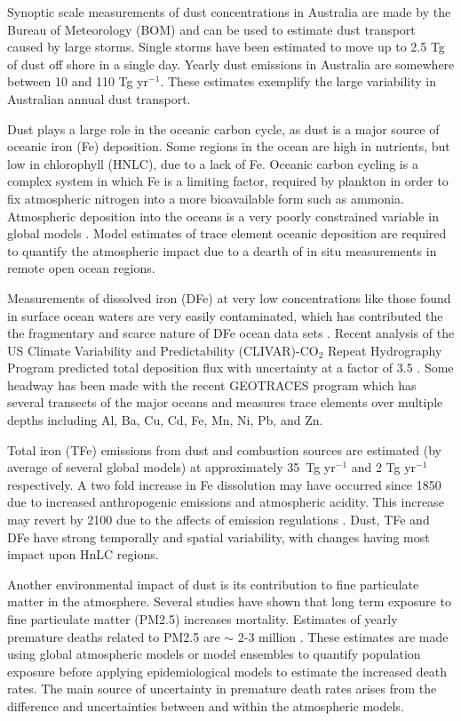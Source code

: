   Synoptic scale measurements of dust concentrations in Australia are made by the Bureau of Meteorology (BOM) and can be used to estimate dust transport caused by large storms. 
  Single storms have been estimated to move up to 2.5 Tg of dust off shore in a single day.
  Yearly dust emissions in Australia are somewhere between 10 and 110 Tg yr$^{-1}$.
  These estimates exemplify the large variability in Australian annual dust transport.

  Dust plays a large role in the oceanic carbon cycle, as dust is a major source of oceanic iron (Fe) deposition.
  Some regions in the ocean are high in nutrients, but low in chlorophyll (HNLC), due to a lack of Fe.
  Oceanic carbon cycling is a complex system in which Fe is a limiting factor, required by plankton in order to fix atmospheric nitrogen into a more bioavailable form such as ammonia.
  Atmospheric deposition into the oceans is a very poorly constrained variable in global models \citep{Grand2015}.
  Model estimates of trace element oceanic deposition are required to quantify the atmospheric impact due to a dearth of in situ measurements in remote open ocean regions.

  Measurements of dissolved iron (DFe) at very low concentrations like those found in surface ocean waters are very easily contaminated, which has contributed the the fragmentary and scarce nature of DFe ocean data sets \citep{Rijkenberg_2014}.
  Recent analysis of the US Climate Variability and Predictability (CLIVAR)-CO$_{2}$ Repeat Hydrography Program predicted total deposition flux with uncertainty at a factor of 3.5 \citep{Grand2015}.
  Some headway has been made with the recent GEOTRACES program which has several transects of the major oceans and measures trace elements over multiple depths including Al, Ba, Cu, Cd, Fe, Mn, Ni, Pb, and Zn.
    
  Total iron (TFe) emissions from dust and combustion sources are estimated (by average of several global models) at approximately 35~Tg yr$^{-1}$ and 2 Tg yr$^{-1}$ respectively. A two fold increase in Fe dissolution may have occurred since 1850 due to increased anthropogenic emissions and atmospheric acidity.
  This increase may revert by 2100 due to the affects of emission regulations \citep{Myriokefalitakis_2015}.
  Dust, TFe and DFe have strong temporally and spatial variability, with changes having most impact upon HnLC regions.

  Another environmental impact of dust is its contribution to fine particulate matter in the atmosphere.
  Several studies have shown that long term exposure to fine particulate matter (PM2.5) increases mortality. 
  Estimates of yearly premature deaths related to PM2.5 are $\sim$ 2-3 million \citep{Hoek_2013, Krewski_2009, Silva_2013, Lelieveld_2015}.   
  These estimates are made using global atmospheric models or model ensembles to quantify population exposure before applying epidemiological models to estimate the increased death rates.
  The main source of uncertainty in premature death rates arises from the difference and uncertainties between and within the atmospheric models.

